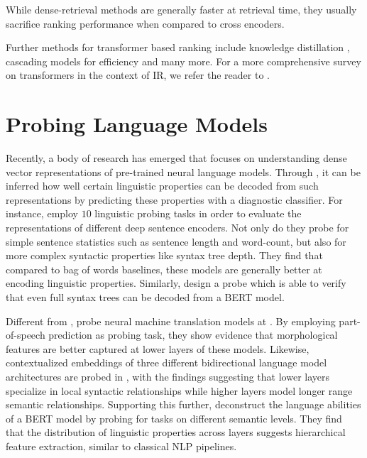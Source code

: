While dense-retrieval methods are generally faster at retrieval time, they usually sacrifice ranking performance when compared to cross encoders.

Further methods for transformer based ranking include knowledge distillation \citep{DBLP:journals/corr/abs-2009-07531, DBLP:journals/corr/abs-2010-02666}, cascading models for efficiency \citep{Nogueira2019MultiStageDR} and many more. For a more comprehensive survey on transformers in the context of IR, we refer the reader to \citep{10.1145/3437963.3441667}.

\section{Probing Language Models}
Recently, a body of research has emerged that focuses on understanding dense vector representations of pre-trained neural language models. Through , it can be inferred how well certain linguistic properties can be decoded from such representations by predicting these properties with a diagnostic classifier. For instance, \citet{conneau-etal-2018-cram} employ $10$ linguistic probing tasks in order to evaluate the representations of different deep sentence encoders. Not only do they probe for simple sentence statistics such as sentence length and word-count, but also for more complex syntactic properties like syntax tree depth. They find that compared to bag of words baselines, these models are generally better at encoding linguistic properties. Similarly, \citet{Hewitt2019ASP} design a probe which is able to verify that even full syntax trees can be decoded from a BERT model.

Different from \citet{conneau-etal-2018-cram}, \citet{Belinkov2017WhatDN} probe neural machine translation models at . By employing part-of-speech prediction as probing task, they show evidence that morphological features are better captured at lower layers of these models. Likewise, contextualized embeddings of three different bidirectional language model architectures are probed in \citep{peters-etal-2018-dissecting}, with the findings suggesting that lower layers specialize in local syntactic relationships while higher layers model longer range semantic relationships. Supporting this further, \citet{tenney-etal-2019-bert} deconstruct the language abilities of a BERT model by probing for tasks on different semantic levels. They find that the distribution of linguistic properties across layers suggests hierarchical feature extraction, similar to classical NLP pipelines.

